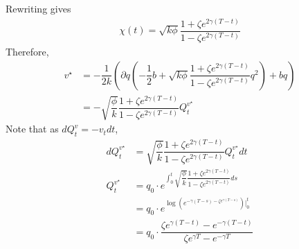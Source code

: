 \documentclass{article}
\begin{document}
Rewriting gives 
\begin{equation*}
    \begin{split}
        \chi(t) = \sqrt{k\phi}\dfrac{1+\zeta e^{2\gamma (T-t)}}{1-\zeta e^{2\gamma (T-t)}}
    \end{split}
\end{equation*}
Therefore,
\begin{equation*}
    \begin{split}
        v^{\star} &=-\dfrac{1}{2k}(\partial q (-\dfrac{1}{2}b+ \sqrt{k\phi}\dfrac{1+\zeta e^{2\gamma (T-t)}}{1-\zeta e^{2\gamma (T-t)}}q^2)+bq)\\
        &= - \sqrt{\dfrac{\phi}{k}}\dfrac{1+\zeta e^{2\gamma (T-t)}}{1-\zeta e^{2\gamma (T-t)}}Q_{t}^{v^{\star}}
    \end{split}
\end{equation*}
Note that as $dQ_{t}^{v} = -v_{t} dt$,\\
\begin{equation*}
    \begin{split}
       dQ_{t}^{v^{\star}} &= \sqrt{\dfrac{\phi}{k}}\dfrac{1+\zeta e^{2\gamma (T-t)}}{1-\zeta e^{2\gamma (T-t)}}Q_{t}^{v^{\star}} dt\\
       Q_{t}^{v^{\star}} &= q_{0} \cdot e^{\int_{0}^{t} \sqrt{\dfrac{\phi}{k}}\dfrac{1+\zeta e^{2\gamma (T-t)}}{1-\zeta e^{2\gamma (T-t)}} ds}\\
       &= q_{0} \cdot e^{\log(e^{-\gamma (T-s) - \zeta e^{\gamma (T-s)}})\Big|_{0}^{t}}\\
       &=q_{0} \cdot \dfrac{\zeta e^{\gamma (T-t)} - e^{-\gamma (T-t)} }{\zeta e^{\gamma T} - e^{-\gamma T}}
    \end{split}
\end{equation*}
\end{document}
